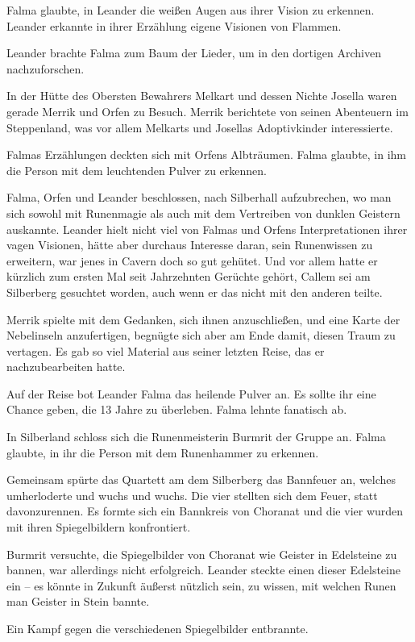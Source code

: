 Falma glaubte, in Leander die weißen Augen aus ihrer Vision zu erkennen. Leander erkannte in ihrer Erzählung eigene Visionen von Flammen.

Leander brachte Falma zum Baum der Lieder, um in den dortigen Archiven nachzuforschen.

In der Hütte des Obersten Bewahrers Melkart und dessen Nichte Josella waren gerade Merrik und Orfen zu Besuch. Merrik berichtete von seinen Abenteuern im Steppenland, was vor allem Melkarts und Josellas Adoptivkinder interessierte.

Falmas Erzählungen deckten sich mit Orfens Albträumen. Falma glaubte, in ihm die Person mit dem leuchtenden Pulver zu erkennen.

Falma, Orfen und Leander beschlossen, nach Silberhall aufzubrechen, wo man sich sowohl mit Runenmagie als auch mit dem Vertreiben von dunklen Geistern auskannte. Leander hielt nicht viel von Falmas und Orfens Interpretationen ihrer vagen Visionen, hätte aber durchaus Interesse daran, sein Runenwissen zu erweitern, war jenes in Cavern doch so gut gehütet. Und vor allem hatte er kürzlich zum ersten Mal seit Jahrzehnten Gerüchte gehört, Callem sei am Silberberg gesuchtet worden, auch wenn er das nicht mit den anderen teilte.

Merrik spielte mit dem Gedanken, sich ihnen anzuschließen, und eine Karte der Nebelinseln anzufertigen, begnügte sich aber am Ende damit, diesen Traum zu vertagen. Es gab so viel Material aus seiner letzten Reise, das er nachzubearbeiten hatte.

Auf der Reise bot Leander Falma das heilende Pulver an. Es sollte ihr eine Chance geben, die 13 Jahre zu überleben. Falma lehnte fanatisch ab.

In Silberland schloss sich die Runenmeisterin Burmrit der Gruppe an. Falma glaubte, in ihr die Person mit dem Runenhammer zu erkennen.

Gemeinsam spürte das Quartett am dem Silberberg das Bannfeuer an, welches umherloderte und wuchs und wuchs. Die vier stellten sich dem Feuer, statt davonzurennen. Es formte sich ein Bannkreis von Choranat und die vier wurden mit ihren Spiegelbildern konfrontiert.

Burmrit versuchte, die Spiegelbilder von Choranat wie Geister in Edelsteine zu bannen, war allerdings nicht erfolgreich. Leander steckte einen dieser Edelsteine ein – es könnte in Zukunft äußerst nützlich sein, zu wissen, mit welchen Runen man Geister in Stein bannte.

Ein Kampf gegen die verschiedenen Spiegelbilder entbrannte. 

